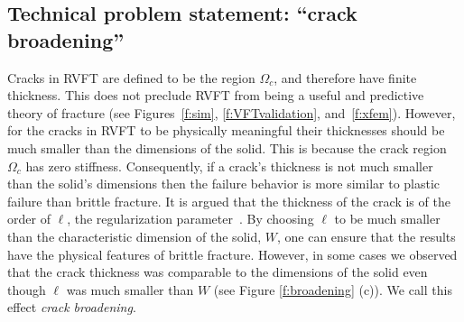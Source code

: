 \documentclass[10pt,letterpaper]{article}
\begin{document}
  \subsection{Technical problem statement: ``crack broadening''}
    \label{s:broadening}

    Cracks in RVFT are defined to be the region $\Omega_c$, and therefore have finite thickness. This does not preclude RVFT from being a useful and predictive theory of fracture (see Figures~\ref{f:sim}, \ref{f:VFTvalidation}, and~\ref{f:xfem}). However, for the cracks in RVFT to be physically meaningful their thicknesses should be much smaller than the dimensions of the solid.  This is because the crack region $\Omega_{c}$ has zero stiffness. Consequently, if a crack's thickness is not much smaller than the solid's dimensions then the failure behavior is more similar to plastic failure than brittle fracture. It is argued that the thickness of the crack is of the order of $\ell$, the regularization parameter~\cite{amiri2014phase}. By choosing $\ell$ to be much smaller than the characteristic dimension of the solid, $W$, one can ensure that the results have the physical features of brittle fracture. However, in some cases we observed that the crack thickness was comparable to the dimensions of the solid even though $\ell$ was much smaller than $W$ (see Figure \ref{f:broadening} (c)). We call this effect \textit{crack broadening}.
%
\end{document}
